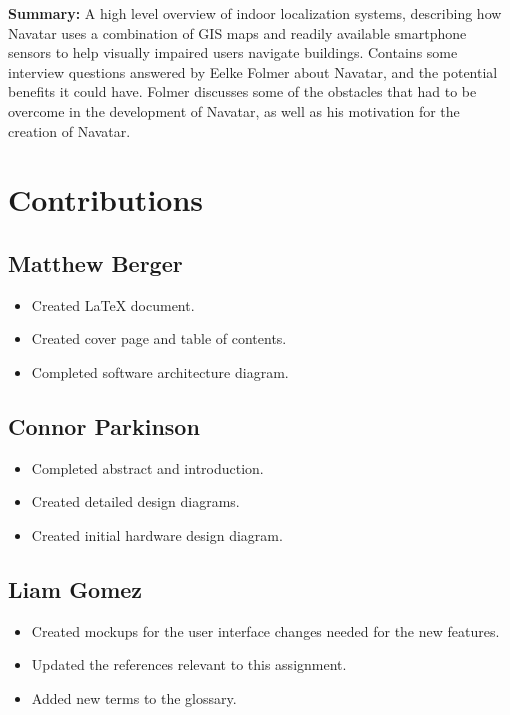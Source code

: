 \documentclass{scrreprt}
\begin{document}
\textbf{Summary:}
 A high level overview of indoor localization systems, describing how Navatar uses a combination of GIS maps and readily available smartphone sensors to help visually impaired users navigate buildings. Contains some interview questions answered by Eelke Folmer about Navatar, and the potential benefits it could have. Folmer discusses some of the obstacles that had to be overcome in the development of Navatar, as well as his motivation for the creation of Navatar.


\chapter{Contributions}
	\section{Matthew Berger}
		\begin{itemize}
			\item Created LaTeX document.
			\item Created cover page and table of contents.
			\item Completed software architecture diagram.
		\end{itemize}
	\section{Connor Parkinson}
		\begin{itemize}
			\item Completed abstract and introduction.
			\item Created detailed design diagrams.
			\item Created initial hardware design diagram.
		\end{itemize}
	\section{Liam Gomez}
		\begin{itemize}
			\item Created mockups for the user interface changes needed for the new features.
			\item Updated the references relevant to this assignment.
			\item Added new terms to the glossary.
		\end{itemize}
		
\end{document}
